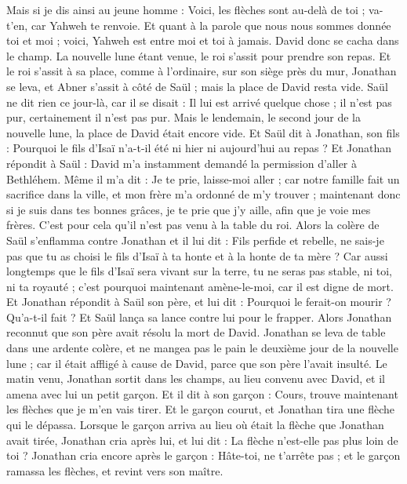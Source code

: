 \begin{multicols}{2}
Mais si je dis ainsi au jeune homme : Voici, les flèches sont au-delà de toi ; va-t'en, car Yahweh te renvoie.
Et quant à la parole que nous nous sommes donnée toi et moi ; voici, Yahweh est entre moi et toi à jamais.
David donc se cacha dans le champ. La nouvelle lune étant venue, le roi s'assit pour prendre son repas.
Et le roi s’assit à sa place, comme à l’ordinaire, sur son siège près du mur, Jonathan se leva, et Abner s'assit à côté de Saül ; mais la place de David resta vide.
Saül ne dit rien ce jour-là, car il se disait : Il lui est arrivé quelque chose ; il n'est pas pur, certainement il n'est pas pur.
Mais le lendemain, le second jour de la nouvelle lune, la place de David était encore vide. Et Saül dit à Jonathan, son fils : Pourquoi le fils d'Isaï n'a-t-il été ni hier ni aujourd'hui au repas ?
Et Jonathan répondit à Saül : David m'a instamment demandé la permission d’aller à Bethléhem.
Même il m'a dit : Je te prie, laisse-moi aller ; car notre famille fait un sacrifice dans la ville, et mon frère m'a ordonné de m'y trouver ; maintenant donc si je suis dans tes bonnes grâces, je te prie que j'y aille, afin que je voie mes frères. C'est pour cela qu'il n'est pas venu à la table du roi.
Alors la colère de Saül s'enflamma contre Jonathan et il lui dit : Fils perfide et rebelle, ne sais-je pas que tu as choisi le fils d'Isaï à ta honte et à la honte de ta mère ?
Car aussi longtemps que le fils d'Isaï sera vivant sur la terre, tu ne seras pas stable, ni toi, ni ta royauté ; c'est pourquoi maintenant amène-le-moi, car il est digne de mort.
Et Jonathan répondit à Saül son père, et lui dit : Pourquoi le ferait-on mourir ? Qu'a-t-il fait ?
Et Saül lança sa lance contre lui pour le frapper. Alors Jonathan reconnut que son père avait résolu la mort de David.
Jonathan se leva de table dans une ardente colère, et ne mangea pas le pain le deuxième jour de la nouvelle lune ; car il était affligé à cause de David, parce que son père l'avait insulté.
Le matin venu, Jonathan sortit dans les champs, au lieu convenu avec David, et il amena avec lui un petit garçon.
Et il dit à son garçon : Cours, trouve maintenant les flèches que je m'en vais tirer. Et le garçon courut, et Jonathan tira une flèche qui le dépassa.
Lorsque le garçon arriva au lieu où était la flèche que Jonathan avait tirée, Jonathan cria après lui, et lui dit : La flèche n'est-elle pas plus loin de toi ?
Jonathan cria encore après le garçon : Hâte-toi, ne t'arrête pas ; et le garçon ramassa les flèches, et revint vers son maître.

\end{multicols}
